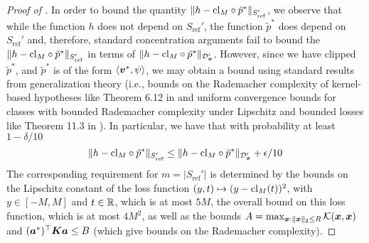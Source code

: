 \documentclass[11pt]{article} %
\numberwithin{equation}{section}
\begin{document}
\begin{proof}[Proof of ]
    In order to bound the quantity $\| h - \mathrm{cl}_M\circ \tilde{p}^* \|_{S_{\mathrm{ref}}'}$, we observe that while the function $h$ does not depend on $S_{\mathrm{ref}}'$, the function $\tilde{p}^*$ does depend on $S_{\mathrm{ref}}'$ and, therefore, standard concentration arguments fail to bound the $\| h - \mathrm{cl}_M\circ \tilde{p}^* \|_{S_{\mathrm{ref}}'}$ in terms of $\| h - \mathrm{cl}_M\circ \tilde{p}^* \|_{{\mathcal{D}}_{{\bm{x}}}'}$. However, since we have clipped $\tilde{p}^*$, and $\tilde{p}^*$ is of the form $\langle {\bm{v}}^*, \psi\rangle$, we may obtain a bound using standard results from generalization theory (i.e., bounds on the Rademacher complexity of kernel-based hypotheses like Theorem 6.12 in \cite{mohri2018foundations} and uniform convergence bounds for classes with bounded Rademacher complexity under Lipschitz and bounded losses like Theorem 11.3 in \cite{mohri2018foundations}). In particular, we have that with probability at least $1-\delta/10$
    \[
        \| h - \mathrm{cl}_M\circ \tilde{p}^* \|_{S_{\mathrm{ref}}'} \le \| h - \mathrm{cl}_M\circ \tilde{p}^* \|_{{\mathcal{D}}_{{\bm{x}}}'} + {\epsilon}/10
    \]
    The corresponding requirement for $m = |S_{\mathrm{ref}}'|$ is determined by the bounds on the Lipschitz constant of the loss function $(y,t)\mapsto (y-\mathrm{cl}_M(t))^2$, with $y\in [-M,M]$ and $t\in\mathbb{R}$, which is at most $5M$, the overall bound on this loss function, which is at most $4M^2$, as well as the bounds $A = \max_{{\bm{x}}:\|{\bm{x}}\|_2\le R}\mathcal{K}({\bm{x}},{\bm{x}})$ and $({\bm{a}}^*)^\top {\bm{K}} {\bm{a}} \le B$ (which give bounds on the Rademacher complexity).


\end{proof}
\end{document}
